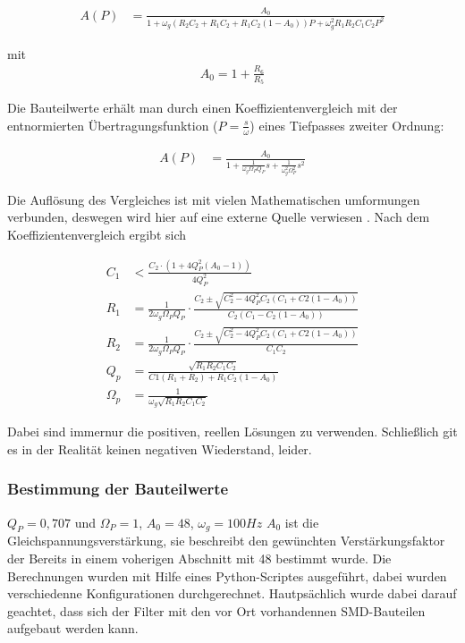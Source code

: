 \begin{align*}
A(P)&=\frac{A_0}{1+\omega_g (R_2 C_2 + R_1 C_2 + R_1 C_2(1-A_0))P + \omega_g^2R_1 R_2 C_1C_2P^2}
\end{align*}

mit
\begin{align*}
A_0=1+\frac{R_6}{R_5}
\end{align*}


Die Bauteilwerte erhält man durch einen Koeffizientenvergleich mit der entnormierten
Übertragungsfunktion ($P=\frac{s}{\omega}$) eines Tiefpasses zweiter Ordnung:

\begin{align*}
A(P)&=\frac{A_0}{1+\frac{1}{\omega_g\Omega_PQ_P}s+\frac{1}{\omega_g^2\Omega_P^2}s^2}
\end{align*}

Die Auflösung des Vergleiches ist mit vielen Mathematischen umformungen verbunden, deswegen wird hier auf eine
externe Quelle verwiesen \cite[S. 102]{Krucker2000}.
Nach dem Koeffizientenvergleich ergibt sich

\begin{align*}
C_1&<\frac{C_2\cdot(1+4Q^2_P(A_0-1))}{4Q^2_P}\\
R_1&=\frac{1}{2\omega_g\Omega_PQ_P} \cdot \frac{C_2\pm\sqrt{C_2^2-4Q^2_PC_2(C_1+C2(1-A_0))}}{C_2(C_1-C_2(1-A_0))}   \\
R_2&=\frac{1}{2\omega_g\Omega_PQ_P} \cdot \frac{C_2\pm\sqrt{C_2^2-4Q^2_PC_2(C_1+C2(1-A_0))}}{C_1C_2}  \\
Q_p&=\frac{\sqrt{R_1R_2C_1C_2}}{C1(R_1+R_2)+R_1C_2(1-A_0)}\\
\Omega_p&=\frac{1}{\omega_g\sqrt{R_1R_2C_1C_2}}
\end{align*}

Dabei sind immernur die positiven, reellen Lösungen zu verwenden. Schließlich git es in der Realität keinen negativen Wiederstand, leider.


\subsubsection{Bestimmung der Bauteilwerte}


$Q_P=0,707$ und $\Omega_P=1$, $A_0=48$, $\omega_g = 100Hz$
$A_0$ ist die Gleichspannungsverstärkung, sie beschreibt den gewünchten Verstärkungsfaktor der Bereits in einem voherigen
Abschnitt mit 48 bestimmt wurde. Die Berechnungen wurden mit Hilfe eines Python-Scriptes ausgeführt, dabei wurden verschiedenne
Konfigurationen durchgerechnet. Hautpsächlich wurde dabei darauf geachtet, dass sich der Filter mit den vor Ort vorhandennen SMD-Bauteilen
aufgebaut werden kann.

